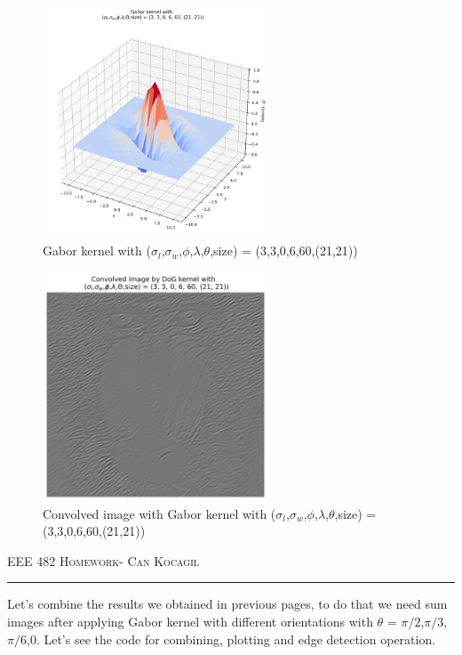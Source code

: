 \documentclass[12pt]{amsart}
\begin{document}
\begin{figure}[ht]
    \centering
    \includegraphics[width = 0.6\textwidth]{images/Gabor_60_3d.png}
    \caption{Gabor kernel with ($\sigma_l$,$\sigma_w$,$\phi$,$\lambda$,$\theta$,size) = (3,3,0,6,60,(21,21))}
\end{figure}


\begin{figure}[ht]
    \centering
    \includegraphics[width = 0.6\textwidth]{images/Gabor_conv_60.png}
    \caption{Convolved image with Gabor kernel with ($\sigma_l$,$\sigma_w$,$\phi$,$\lambda$,$\theta$,size) = (3,3,0,6,60,(21,21))}
\end{figure}




\newpage
{\scshape EEE 482} \hfill {\scshape \large  Homework-\relax} \hfill {\scshape Can Kocagil}
\smallskip
\hrule
\vspace{2mm}

Let's combine the results we obtained in previous pages, to do that we need sum images after applying Gabor kernel with different orientations with $\theta$ = $\pi/2$,$\pi/3$,$\pi/6$,$0$. Let's see the code for combining, plotting and edge detection operation.
\end{document}
